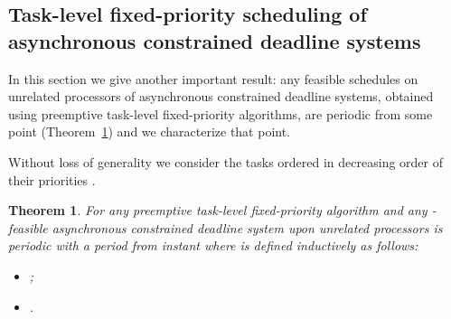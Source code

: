 \documentclass[a4paper,11pt]{article}
\newtheorem{Theorem}{Theorem}
\begin{document}
\subsection{Task-level fixed-priority scheduling of asynchronous constrained
  deadline systems} \label{asynSect}

In this section we give another important result: any feasible schedules on  unrelated processors of asynchronous constrained deadline systems,
obtained using preemptive task-level fixed-priority algorithms, are periodic from some point (Theorem~\ref{asynPer}) and we characterize that point.

Without loss of generality we consider the tasks ordered in decreasing
order of their priorities .


\begin{Theorem} \label{asynPer} For any preemptive task-level fixed-priority
algorithm  and any -feasible asynchronous constrained deadline system  upon  unrelated processors is periodic with a period  from instant  where  is defined inductively as follows:

  \begin{itemize}
  \item ; 
  \item .
  \end{itemize}
\end{Theorem}
\end{document}
